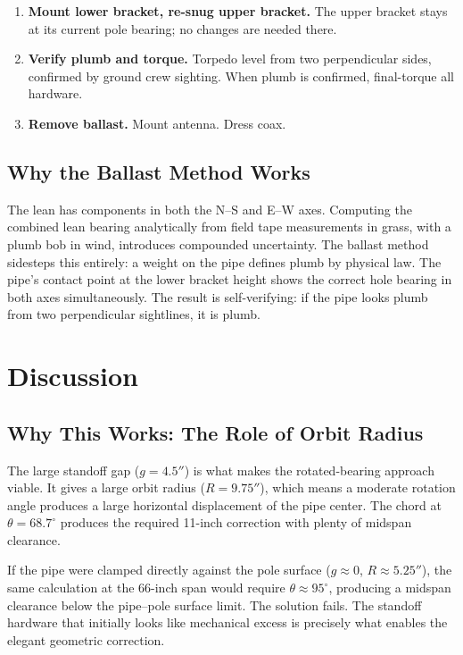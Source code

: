 \documentclass[11pt,twocolumn]{article}
\begin{document}
\begin{enumerate}[leftmargin=*, itemsep=4pt, label=\arabic{*}.]
\item \textbf{Mount lower bracket, re-snug upper bracket.} The upper bracket
  stays at its current pole bearing; no changes are needed there.

\item \textbf{Verify plumb and torque.} Torpedo level from two perpendicular
  sides, confirmed by ground crew sighting. When plumb is confirmed, final-torque
  all hardware.

\item \textbf{Remove ballast.} Mount antenna. Dress coax.
\end{enumerate}

\subsection{Why the Ballast Method Works}

The lean has components in both the N--S and E--W axes. Computing the combined
lean bearing analytically from field tape measurements in grass, with a plumb
bob in wind, introduces compounded uncertainty. The ballast method sidesteps
this entirely: a weight on the pipe defines plumb by physical law. The pipe's
contact point at the lower bracket height shows the correct hole bearing in
both axes simultaneously. The result is self-verifying: if the pipe looks plumb
from two perpendicular sightlines, it is plumb.

\section{Discussion}

\subsection{Why This Works: The Role of Orbit Radius}

The large standoff gap ($g = 4.5''$) is what makes the rotated-bearing approach
viable. It gives a large orbit radius ($R = 9.75''$), which means a moderate
rotation angle produces a large horizontal displacement of the pipe center. The
chord at $\theta = 68.7^\circ$ produces the required 11-inch correction with
plenty of midspan clearance.

If the pipe were clamped directly against the pole surface ($g \approx 0$,
$R \approx 5.25''$), the same calculation at the 66-inch span would require
$\theta \approx 95^\circ$, producing a midspan clearance below the pipe--pole
surface limit. The solution fails. The standoff hardware that initially looks
like mechanical excess is precisely what enables the elegant geometric
correction.
\end{document}
